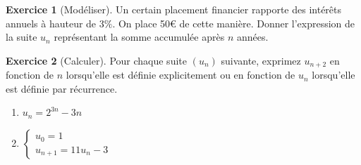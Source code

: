 \documentclass{exam}
\theoremstyle{definition}
\newtheorem{exercice}{Exercice}
\begin{document}
\begin{exercice}[Modéliser]
    Un certain placement financier rapporte des intérêts annuels à hauteur de $3\%$. On place 50€ de cette manière. Donner l'expression de la suite $u_n$ représentant la somme accumulée après $n$ années.

    \begin{center}
    \end{center}
\end{exercice}

\begin{exercice}[Calculer]
    Pour chaque suite $(u_n)$ suivante, exprimez $u_{n+2}$ en fonction de $n$ lorsqu'elle est définie explicitement ou en fonction de $u_n$ lorsqu'elle est définie par récurrence.
    \begin{enumerate}
        \item $u_n = 2^{3n} - 3n$
        \item $\begin{cases} u_0 = 1\\ u_{n+1} = 11 u_n - 3\end{cases}$
    \end{enumerate}
    \begin{center}
    \end{center}
\end{exercice}
\end{document}
